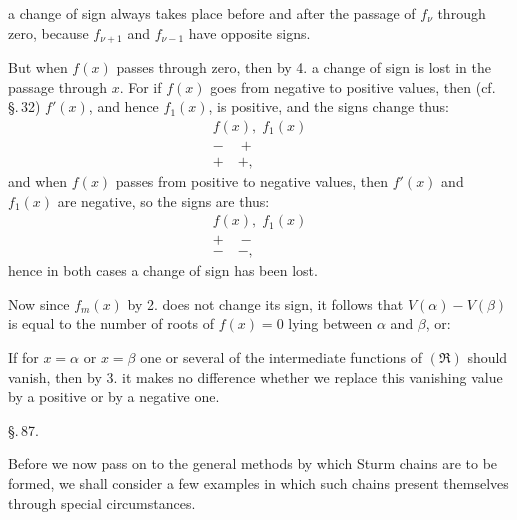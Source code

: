 
a change of sign always takes place before and after the passage
of $f_\nu$ through zero, because $f_{\nu+1}$ and $f_{\nu-1}$
have opposite signs.

But when $f(x)$ passes through zero, then by 4. a change of sign
is lost in the passage through $x$. For if $f(x)$ goes from
negative to positive values, then (cf. \S.\,32) $f'(x)$,
and hence $f_1(x)$, is positive, and the signs change thus:
\[
\begin{array}{c}
f(x), \; f_1(x) \\
- \quad + \\
+ \quad +,
\end{array}
\]
and when $f(x)$ passes from positive to negative values, then
$f'(x)$ and $f_1(x)$ are negative, so the signs are thus:
\[
\begin{array}{c}
f(x), \; f_1(x) \\
+ \quad - \\
- \quad -,
\end{array}
\]
hence in both cases a change of sign has been lost.

Now since $f_m(x)$ by 2. does not change its sign, it follows
that $V(\alpha) - V(\beta)$ is equal to the number of roots of
$f(x) = 0$ lying between $\alpha$ and $\beta$, or:


If for $x = \alpha$ or $x = \beta$ one or several of the
intermediate functions of $(\mathfrak{R})$ should vanish,
then by 3. it makes no difference whether we replace this vanishing
value by a positive or by a negative one.

\begin{center}
\S.\,87.

\end{center}

Before we now pass on to the general methods by which
Sturm chains are to be formed, we shall consider a few examples
in which such chains present themselves through special
circumstances.
